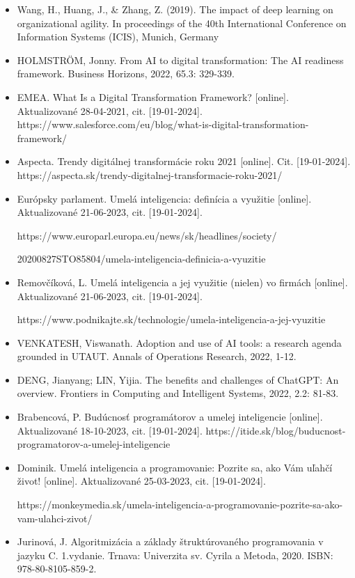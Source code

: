 \begin{itemize}
    \item Wang, H., Huang, J., \& Zhang, Z. (2019). The impact of deep learning on organizational agility. In proceedings of the 40th International Conference on Information Systems (ICIS), Munich, Germany
    \item HOLMSTRÖM, Jonny. From AI to digital transformation: The AI readiness framework. Business Horizons, 2022, 65.3: 329-339.
    \item EMEA. What Is a Digital Transformation Framework? [online]. Aktualizované  28-04-2021, cit. [19-01-2024]. https://www.salesforce.com/eu/blog/what-is-digital-transformation-framework/
    \item Aspecta. Trendy digitálnej transformácie roku 2021 [online]. Cit. [19-01-2024]. https://aspecta.sk/trendy-digitalnej-transformacie-roku-2021/
    \item Európsky parlament. Umelá inteligencia: definícia a využitie [online]. Aktualizované  21-06-2023, cit. [19-01-2024]. \par https://www.europarl.europa.eu/news/sk/headlines/society/ \par 20200827STO85804/umela-inteligencia-definicia-a-vyuzitie
    \item Removčíková, L. Umelá inteligencia a jej využitie (nielen) vo firmách [online]. Aktualizované  21-06-2023, cit. [19-01-2024]. \par https://www.podnikajte.sk/technologie/umela-inteligencia-a-jej-vyuzitie
    \item VENKATESH, Viswanath. Adoption and use of AI tools: a research agenda grounded in UTAUT. Annals of Operations Research, 2022, 1-12.
    \item DENG, Jianyang; LIN, Yijia. The benefits and challenges of ChatGPT: An overview. Frontiers in Computing and Intelligent Systems, 2022, 2.2: 81-83.
    \item Brabencová, P. Budúcnosť programátorov a umelej inteligencie [online]. Aktualizované  18-10-2023, cit. [19-01-2024]. https://itide.sk/blog/buducnost-programatorov-a-umelej-inteligencie
    \item Dominik. Umelá inteligencia a programovanie: Pozrite sa, ako Vám uľahčí život! [online]. Aktualizované  25-03-2023, cit. [19-01-2024].\par https://monkeymedia.sk/umela-inteligencia-a-programovanie-pozrite-sa-ako-vam-ulahci-zivot/
    \item Jurinová, J. Algoritmizácia a základy štruktúrovaného programovania v jazyku C. 1.vydanie. Trnava: Univerzita sv. Cyrila a Metoda, 2020. ISBN: 978-80-8105-859-2.

\end{itemize}
